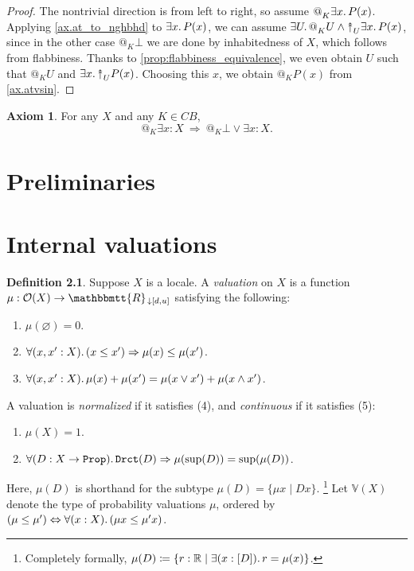 \documentclass[11pt, oneside, article]{memoir}
\makeatletter
\theoremstyle{plain}
\theoremstyle{definition}
\newtheorem{definition}[theorem]{Definition}
\newtheorem{axiom}{Axiom}
\theoremstyle{remark}
\DeclarePairedDelimiter{\subtype}{[}{]}
\newcommand{\const}[1]{\mathtt{#1}}
\newcommand{\internal}[1]{\raisebox{-.03ex}{$\mathbbmtt{#1}$}}
\newcommand{\hs}{\hspace{1.1pt}}
\newcommand{\RR}{\mathbb{R}}
\newcommand{\VV}{\mathbb{V}}
\newcommand{\tRR}{\internal{R}\hs}
\newcommand{\tRRat}[1]{\tRR_{\SeeInline{#1}}}
\newcommand{\Prop}{\const{Prop}}
\newcommand{\BaseSpace}{B}
\newcommand{\AtSymbol}{{@}}
\newcommand{\SeeSymbol}{{\down}}  %
\newcommand{\InSymbol}{{\upclose}}%
\newcommand{\At}[2][]{\AtSymbol^{#1}_{#2}}
\newcommand{\In}[2][]{\InSymbol^{#1}_{#2}}
\newcommand{\SeeInline}[1]{\SeeSymbol{#1}}
\newcommand{\upclose}{{\rotatebox[origin=c]{90}{$\twoheadrightarrow$}}}
\newcommand{\down}{\mathord{\downarrow}}
\newcommand{\imp}{\Rightarrow}
\renewcommand{\iff}{\Leftrightarrow}
\makeatother
\begin{document}
\begin{proof}
The nontrivial direction is from left to right, so assume $\At{K} \exists x\ldotp P(x)$. Applying \cref{ax.at_to_nghbhd} to $\exists x\ldotp P(x)$, we can assume $\exists U\ldotp \At{K} U \wedge \In{U} \exists x\ldotp P(x)$, since in the other case $\At{K}\bot$ we are done by inhabitedness of $X$, which follows from flabbiness. Thanks to \cref{prop:flabbiness_equivalence}, we even obtain $U$ such that $\At{K} U$ and $\exists x\ldotp \In{U} P(x)$. Choosing this $x$, we obtain $\At{K} P(x)$ from \cref{ax.atvsin}.
\end{proof}

\begin{axiom}
For any $X$ and any $K\in C\BaseSpace$,
\[
	\At{K} \exists x : X \: \Rightarrow \: \At{K} \bot \vee \exists x : X.
\]
\end{axiom}

\chapter{Preliminaries}

\chapter{Internal valuations}



\begin{definition}\label{def.valuation}
Suppose $X$ is a locale. A \emph{valuation} on $X$ is a function $\mu:\mathcal{O}(X)\to\tRRat{[d,u]}$ satisfying the following:
\begin{enumerate}
	\item $\mu(\varnothing)=0$.
	\item $\forall(x,x':X)\ldotp(x\leq x')\imp\mu(x)\leq\mu(x')$.
	\item $\forall(x,x':X)\ldotp\mu(x)+\mu(x')=\mu(x\vee x')+\mu(x\wedge x')$.
\end{enumerate}
A valuation is \emph{normalized} if it satisfies (4), and \emph{continuous} if it satisfies (5):
\begin{enumerate}[resume]
	\item $\mu(X) = 1$.
	\item $\forall(D:X\to\Prop)\ldotp\const{Drct}(D)\imp \mu(\sup(D))=\sup(\mu(D))$.
\end{enumerate}
Here, $\mu(D)$ is shorthand for the subtype $\mu(D)=\{\mu x\mid Dx\}$.%
\footnote{Completely formally, $\mu(D)\coloneqq\{r:\RR\mid\exists(x:\subtype{D})\ldotp r=\mu(x)\}$.}
Let $\VV(X)$ denote the type of probability valuations $\mu$, ordered by $(\mu\leq\mu')\iff\forall(x:X)\ldotp(\mu x\leq \mu'x)$.
\end{definition}
\end{document}
